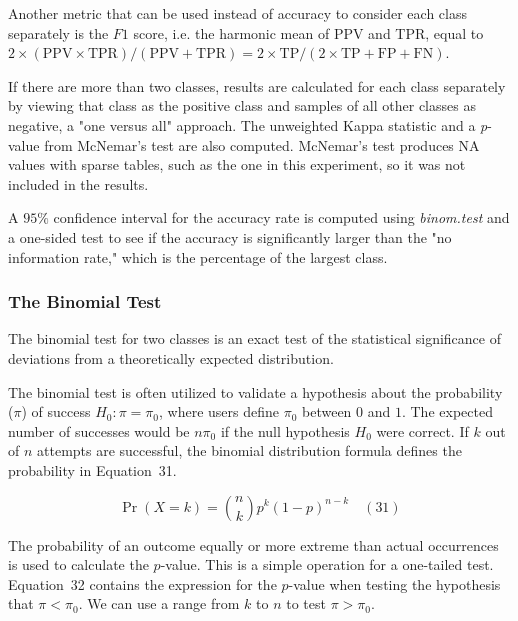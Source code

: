 \documentclass[preprint,12pt]{elsarticle}
\begin{document}
Another metric that can be used instead of accuracy to consider each class separately is the $F1$ score, i.e. the harmonic mean of PPV and TPR, equal to $2 \times (\mathrm{PPV} \times \mathrm{TPR}) / (\mathrm{PPV} + \mathrm{TPR}) = 2 \times \mathrm{TP} / (2 \times \mathrm{TP} + \mathrm{FP} + \mathrm{FN})$.

If there are more than two classes, results are calculated for each class separately by viewing that class as the positive class and samples of all other classes as negative, a "one versus all" approach.
The unweighted Kappa statistic and a \textit{p}-value from McNemar's test are also computed. McNemar's test produces NA values with sparse tables, such as the one in this experiment, so it was not included in the results.

A $95\%$ confidence interval for the accuracy rate is computed using \textit{binom.test} and a one-sided test \cite{rdocumentationBinomtestFunction, clopper1934use, conover1999practical, hollander2013nonparametric} to see if the accuracy is significantly larger than the "no information rate," which is the percentage of the largest class.

\subsubsection{The Binomial Test}

The binomial test \cite{howell1992statistical, graphpadGraphPadPrism} for two classes is an exact test of the statistical significance of deviations from a theoretically expected distribution.

The binomial test is often utilized to validate a hypothesis about the probability ($\pi$) of success 
$H_{0}\colon \pi =\pi_{0}$, where users define $\pi_{0}$ between $0$ and $1$. The expected number of successes would be $n\pi_{0}$ if the null hypothesis $H_{0}$ were correct. If $k$ out of $n$ attempts are successful, the binomial distribution formula defines the probability in Equation~31.

\begin{equation}
	\Pr(X=k)={\binom{n}{k}}p^{k}(1-p)^{n-k}
	\quad\left(31\right)
\end{equation}

The probability of an outcome equally or more extreme than actual occurrences is used to calculate the $p$-value. This is a simple operation for a one-tailed test. Equation~32 contains the expression for the $p$-value when testing the hypothesis that $\pi <\pi_{0}$. We can use a range from $k$ to $n$ to test $\pi >\pi_{0}$.
\end{document}
